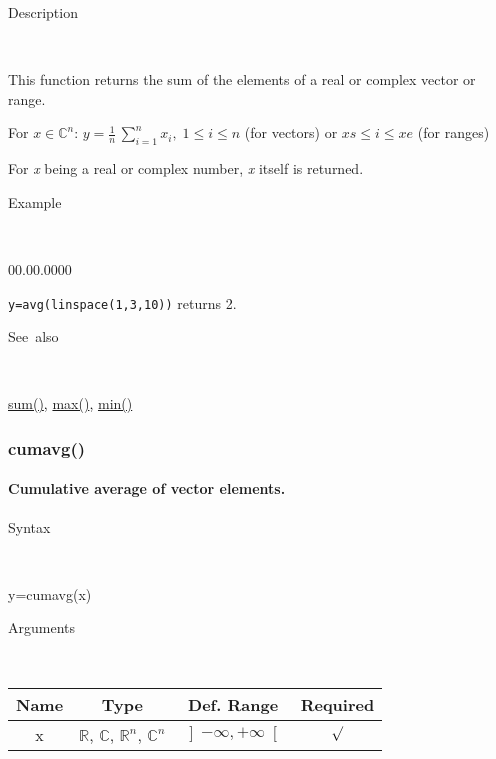 \begin{description}
\item [Description]~
\end{description}
This function returns the sum of the elements of a real or complex
vector or range.

\medskip{}
For $x\in$$\mathbb{C}^{n}$: $y={\displaystyle \frac{1}{n}}\,$$\sum\limits _{i=1}^{n}x_{i},\;1\leq i\leq n$
(for vectors) or $xs\leq i\leq xe$ (for ranges)
\medskip{}

\noindent For \textit{x} being a real or complex number, \textit{x}
itself is returned.

\begin{description}
\item [Example]~
\end{description}
\begin{lyxlist}{00.00.0000}
\item [\texttt{y=avg(linspace(1,3,10))}]returns 2.
\end{lyxlist}
\begin{description}
\item [See~also]~
\end{description}
\textcolor{blue}{\hyperlink{sum}{sum()}}\textcolor{black}{,} \textcolor{blue}{\hyperlink{max}{max()}}\textcolor{black}{,}
\textcolor{blue}{\hyperlink{min}{min()}}


\newpage
\subsubsection*{\hypertarget{cumavg}{}{\Large cumavg()}}


\paragraph{\label{par:Cumulative-average}Cumulative average of vector elements.}

\begin{description}
\item [Syntax]~
\end{description}
y=cumavg(x)

\begin{description}
\item [Arguments]~
\end{description}
\begin{tabular}{|c|c|c|c|}
\hline 
Name&
Type&
Def. Range&
Required\tabularnewline
\hline
\hline 
x&
$\mathbb{R}$, $\mathbb{C}$, $\mathbb{R}^{n}$, $\mathbb{C}^{n}$&
$\left]-\infty,+\infty\right[$&
$\surd$\tabularnewline
\hline
\end{tabular}

